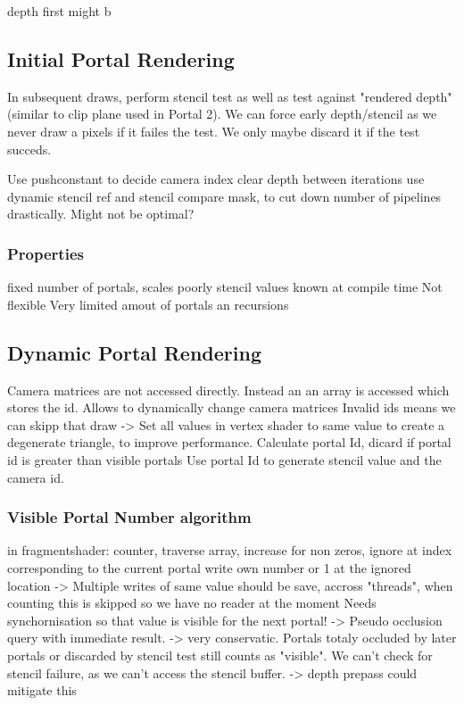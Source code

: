 depth first might b

\subsection{Initial Portal Rendering}
In subsequent draws, perform stencil test as well as test against "rendered depth" (similar to clip plane used in Portal 2).
We can force early depth/stencil as we never draw a pixels if it failes the test. We only maybe discard it if the test succeds.

Use pushconstant to decide camera index
clear depth between iterations
use dynamic stencil ref and stencil compare mask, to cut down number of pipelines drastically. Might not be optimal?


\subsubsection{Properties}
fixed number of portals, scales poorly
stencil values known at compile time
Not flexible
Very limited amout of portals an recursions

\subsection{Dynamic Portal Rendering}
Camera matrices are not accessed directly. Instead an an array is accessed which stores the id. Allows to dynamically change camera matrices
Invalid ids means we can skipp that draw -> Set all values in vertex shader to same value to create a degenerate triangle, to improve performance.
Calculate portal Id, dicard if portal id is greater than visible portals
Use portal Id to generate stencil value and the camera id.


\subsubsection{Visible Portal Number algorithm}
in fragmentshader: counter, traverse array, increase for non zeros, ignore at index corresponding to the current portal
write own number or 1 at the ignored location -> Multiple writes of same value should be save, accross "threads", when counting this is skipped so we have no reader at the moment
Needs synchornisation so that value is visible for the next portal!
-> Pseudo occlusion query with immediate result.
-> very conservatic. Portals totaly occluded by later portals or discarded by stencil test still counts as "visible". We can't check for stencil failure, as we can't access the stencil buffer.
-> depth prepass could mitigate this


